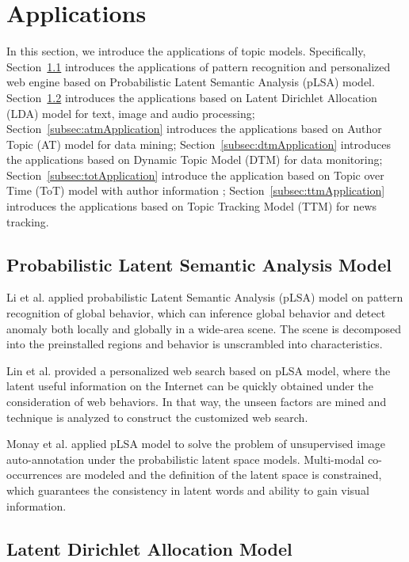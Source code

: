 \section{Applications}

In this section, we introduce the applications of topic models. Specifically, Section~\ref{subsec:plsaApplication} introduces the applications of pattern recognition and personalized web engine based on Probabilistic Latent Semantic Analysis (pLSA) model. Section~\ref{subsec:ldaApplication} introduces the applications based on Latent Dirichlet Allocation (LDA) model for text, image and audio processing; Section~\ref{subsec:atmApplication} introduces the applications based on Author Topic (AT) model for data mining; Section~\ref{subsec:dtmApplication} introduces the applications based on Dynamic Topic Model (DTM) for data monitoring; Section~\ref{subsec:totApplication} introduce the application based on Topic over Time (ToT) model with author information ; Section~\ref{subsec:ttmApplication} introduces the applications based on Topic Tracking Model (TTM) for news tracking.

\subsection{Probabilistic Latent Semantic Analysis Model}
\label{subsec:plsaApplication}

Li et al. \cite{li2008global} applied probabilistic Latent Semantic Analysis (pLSA) model on pattern recognition of global behavior, which can inference global behavior and detect anomaly both locally and globally in a wide-area scene. The scene is decomposed into the preinstalled regions and behavior is unscrambled into characteristics.

Lin et al. \cite{lin2005using} provided a personalized web search based on pLSA model, where the latent useful information on the Internet can be quickly obtained under the consideration of web behaviors. In that way, the unseen factors are mined  and technique is analyzed to construct  the customized web search.

Monay et al. \cite{monay2004plsa} applied pLSA model to solve the problem of unsupervised image auto-annotation under the probabilistic latent space models. Multi-modal co-occurrences are modeled and the definition of the latent space is constrained, which guarantees the consistency in latent words and ability to gain visual information.

\subsection{Latent Dirichlet Allocation Model}
\label{subsec:ldaApplication}

